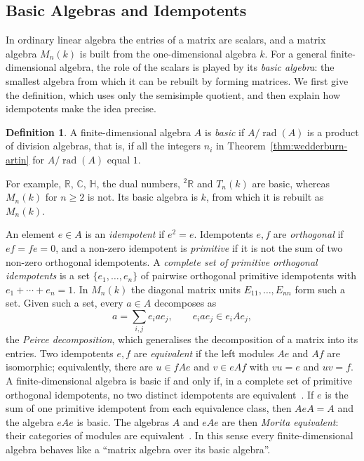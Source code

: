 \documentclass[12pt, a4paper]{report}
\theoremstyle{plain}
\theoremstyle{definition}
\newtheorem{definition}[theorem]{Definition}
\theoremstyle{remark}
\theoremstyle{plain}
\newcommand{\rad}[0]{\operatorname{rad}} %
\newcommand{\RR}{\mathbb{R}}
\newcommand{\CC}{\mathbb{C}}
\newcommand{\HH}{\mathbb{H}}
\newcommand{\twoR}{{}^{2}\mathbb{R}}
\begin{document}
\subsection{Basic Algebras and Idempotents}
\label{subsec:basic}
In ordinary linear algebra the entries of a matrix are scalars, and a matrix algebra $M_n(k)$ is built from the one-dimensional algebra $k$. For a general finite-dimensional algebra, the role of the scalars is played by its \emph{basic algebra}: the smallest algebra from which it can be rebuilt by forming matrices. We first give the definition, which uses only the semisimple quotient, and then explain how idempotents make the idea precise.

\begin{definition}\label{def:basic}
A finite-dimensional algebra $A$ is \emph{basic} if $A/\rad(A)$ is a product of division algebras, that is, if all the integers $n_i$ in Theorem~\ref{thm:wedderburn-artin} for $A/\rad(A)$ equal $1$.
\end{definition}

For example, $\RR$, $\CC$, $\HH$, the dual numbers, $\twoR$ and $T_n(k)$ are basic, whereas $M_n(k)$ for $n\geq2$ is not. Its basic algebra is $k$, from which it is rebuilt as $M_n(k)$.

An element $e\in A$ is an \emph{idempotent} if $e^2=e$. Idempotents $e,f$ are \emph{orthogonal} if $ef=fe=0$, and a non-zero idempotent is \emph{primitive} if it is not the sum of two non-zero orthogonal idempotents. A \emph{complete set of primitive orthogonal idempotents} is a set $\{e_1,\dots,e_n\}$ of pairwise orthogonal primitive idempotents with $e_1+\cdots+e_n=1$. In $M_n(k)$ the diagonal matrix units $E_{11},\dots,E_{nn}$ form such a set. Given such a set, every $a\in A$ decomposes as
\begin{equation}\label{eq:peirce}
 a=\sum_{i,j} e_iae_j,\qquad e_iae_j\in e_iAe_j,
\end{equation}
the \emph{Peirce decomposition}, which generalises the decomposition of a matrix into its entries. Two idempotents $e,f$ are \emph{equivalent} if the left modules $Ae$ and $Af$ are isomorphic; equivalently, there are $u\in fAe$ and $v\in eAf$ with $vu=e$ and $uv=f$. A finite-dimensional algebra is basic if and only if, in a complete set of primitive orthogonal idempotents, no two distinct idempotents are equivalent~\cite[\S I.6]{AssemSimsonSkowronski2006}. If $e$ is the sum of one primitive idempotent from each equivalence class, then $AeA=A$ and the algebra $eAe$ is basic. The algebras $A$ and $eAe$ are then \emph{Morita equivalent}: their categories of modules are equivalent~\cite{AssemSimsonSkowronski2006,AuslanderReitenSmalo1995}. In this sense every finite-dimensional algebra behaves like a ``matrix algebra over its basic algebra''.
\end{document}
